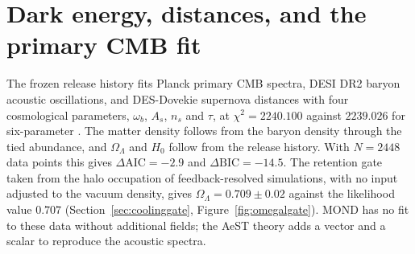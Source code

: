 \section{Dark energy, distances, and the primary CMB fit}
\label{sec:cosmology}

The frozen release history fits Planck primary CMB spectra, DESI DR2
baryon acoustic oscillations, and DES-Dovekie supernova distances with
four cosmological parameters, $\omega_b$, $A_s$, $n_s$ and $\tau$, at
$\chi^2=2240.100$ against $2239.026$ for six-parameter \LCDM. The
matter density follows from the baryon density through the tied
abundance, and $\Omega_\Lambda$ and $H_0$ follow from the release
history. With $N=2448$ data points this gives $\Delta\mathrm{AIC}=-2.9$
and $\Delta\mathrm{BIC}=-14.5$. The retention gate taken from the halo
occupation of feedback-resolved simulations, with no input adjusted to the
vacuum density, gives $\Omega_\Lambda=0.709\pm0.02$ against the
likelihood value $0.707$ (Section~\ref{sec:coolinggate},
Figure~\ref{fig:omegalgate}). MOND has no fit
to these data without additional fields; the AeST theory adds a vector
and a scalar to reproduce the acoustic spectra. \cite{skordis21}

